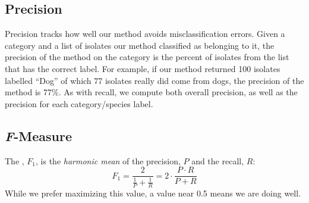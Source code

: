 \subsection{Precision}
Precision tracks how well our method avoids misclassification errors. 
Given a category and a list of isolates our method classified as belonging to it, the precision of the method on the
category is the percent of isolates from the list that has the correct label.
For example, if our method returned 100 isolates labelled ``Dog'' of which 77 isolates really did come from dogs, the precision of the method is 77\%. As with recall, we compute both overall precision, as well as the precision for each category/species label.

\subsection{\textit{F}-Measure}
The \fmeasure{}, $F_1$, is the \textit{harmonic mean} of the precision, $P$ and the recall, $R$:
\begin{equation*}
    F_1 
    =
    \frac{2}{\frac{1}{P}
    +
    \frac{1}{R}}
    = 2\cdot
    \frac{P\cdot R}
    {P + R}
\end{equation*}
While we prefer maximizing this value, a value near 0.5 means we are doing well.